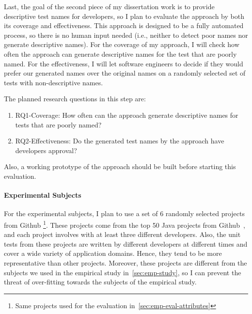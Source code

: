 Last, the goal of the second piece of my dissertation work is to provide descriptive test names for developers, so I plan to evaluate the approach by both its coverage and effectiveness.
%
This approach is designed to be a fully automated process, so there is no human input needed (i.e., neither to detect poor names nor generate descriptive names).
%
For the coverage of my approach, I will check how often the approach can generate descriptive names for the test that are poorly named.
%
For the effectiveness, I will let software engineers to decide if they would prefer our generated names over the original names on a randomly selected set of tests with non-descriptive names.



The planned research questions in this step are:
%
\begin{enumerate}
    \item RQ1-Coverage: How often can the approach generate descriptive names for tests that are poorly named?
    \item RQ2-Effectiveness: Do the generated test names by the approach have developers approval?
\end{enumerate}
%
Also, a working prototype of the approach should be built before starting this evaluation.

\paragraph{Experimental Subjects}

For the experimental subjects, I plan to use a set of \num{6} randomly selected projects from Github \footnote{Same projects used for the evaluation in~\cref{sec:emp-eval-attributes}}.
%
These projects come from the top \num{50} Java projects from Github~\cite{top50projects}, and each project involves with at least three different developers.
%
Also, the unit tests from these projects are written by different developers at different times and cover a wide variety of application domains.
%
Hence, they tend to be more representative than other projects.
%
Moreover, these projects are different from the subjects we used in the empirical study in~\cref{sec:emp-study}, so I can prevent the threat of over-fitting towards the subjects of the empirical study.


